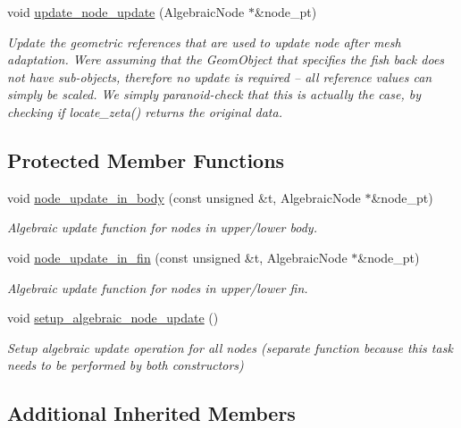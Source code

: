 \begin{DoxyCompactItemize}
void \hyperlink{classoomph_1_1AlgebraicFishMesh_a4f992939c299f87abc762c14aab50b5c}{update\+\_\+node\+\_\+update} (Algebraic\+Node $\ast$\&node\+\_\+pt)
\begin{DoxyCompactList}\small\item\em Update the geometric references that are used to update node after mesh adaptation. We\textquotesingle{}re assuming that the Geom\+Object that specifies the fish back does not have sub-\/objects, therefore no update is required -- all reference values can simply be scaled. We simply paranoid-\/check that this is actually the case, by checking if locate\+\_\+zeta() returns the original data. \end{DoxyCompactList}\end{DoxyCompactItemize}
\subsection*{Protected Member Functions}
\begin{DoxyCompactItemize}
\item 
void \hyperlink{classoomph_1_1AlgebraicFishMesh_a4aee83d1b0a42418fe886b2f244c1d49}{node\+\_\+update\+\_\+in\+\_\+body} (const unsigned \&t, Algebraic\+Node $\ast$\&node\+\_\+pt)
\begin{DoxyCompactList}\small\item\em Algebraic update function for nodes in upper/lower body. \end{DoxyCompactList}\item 
void \hyperlink{classoomph_1_1AlgebraicFishMesh_ad4a6f95e21e3d81b9defde90636e7d45}{node\+\_\+update\+\_\+in\+\_\+fin} (const unsigned \&t, Algebraic\+Node $\ast$\&node\+\_\+pt)
\begin{DoxyCompactList}\small\item\em Algebraic update function for nodes in upper/lower fin. \end{DoxyCompactList}\item 
void \hyperlink{classoomph_1_1AlgebraicFishMesh_a1a6d22eedc77299d843274e8ce34b560}{setup\+\_\+algebraic\+\_\+node\+\_\+update} ()
\begin{DoxyCompactList}\small\item\em Setup algebraic update operation for all nodes (separate function because this task needs to be performed by both constructors) \end{DoxyCompactList}\end{DoxyCompactItemize}
\subsection*{Additional Inherited Members}


